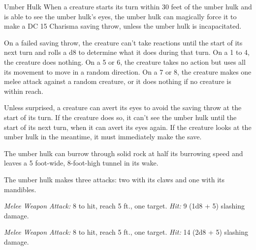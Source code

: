 \documentclass[10pt,a4paper,twoside,bg=print,twocolumn,openany,nodeprecatedcode]{dndbook}
\begin{document}
\begin{DndMonster}[float=t]{Umber Hulk}
\DndMonsterBasics[
armor-class = {18 (natural armor)},
hit-points = {\DndDice{11d10 + 33}},
speed = {30 ft., burrow 20 ft.}
]
\DndMonsterAbilityScores[
 str = 20,
 dex = 13,
 con = 16,
 int = 9,
 wis = 10,
 cha = 10
]
\DndMonsterDetails[
senses = {darkvision 120 ft., tremorsense 60 ft., passive perception 10},
languages = {Umber Hulk},
challenge = 5,
]
When a creature starts its turn within 30 feet of the umber hulk and is able to see the umber hulk's eyes, the umber hulk can magically force it to make a DC 15 Charisma saving throw, unless the umber hulk is incapacitated.

On a failed saving throw, the creature can't take reactions until the start of its next turn and rolls a d8 to determine what it does during that turn. On a 1 to 4, the creature does nothing. On a 5 or 6, the creature takes no action but uses all its movement to move in a random direction. On a 7 or 8, the creature makes one melee attack against a random creature, or it does nothing if no creature is within reach.

Unless surprised, a creature can avert its eyes to avoid the saving throw at the start of its turn. If the creature does so, it can't see the umber hulk until the start of its next turn, when it can avert its eyes again. If the creature looks at the umber hulk in the meantime, it must immediately make the save.

The umber hulk can burrow through solid rock at half its burrowing speed and leaves a 5 foot-wide, 8-foot-high tunnel in its wake.

The umber hulk makes three attacks: two with its claws and one with its mandibles.

\textsl{Melee Weapon Attack:} 8 to hit, reach 5 ft., one target. \textsl{Hit:} 9 (1d8 + 5) slashing damage.

\textsl{Melee Weapon Attack:} 8 to hit, reach 5 ft., one target. \textsl{Hit:} 14 (2d8 + 5) slashing damage.

\end{DndMonster}
\end{document}
